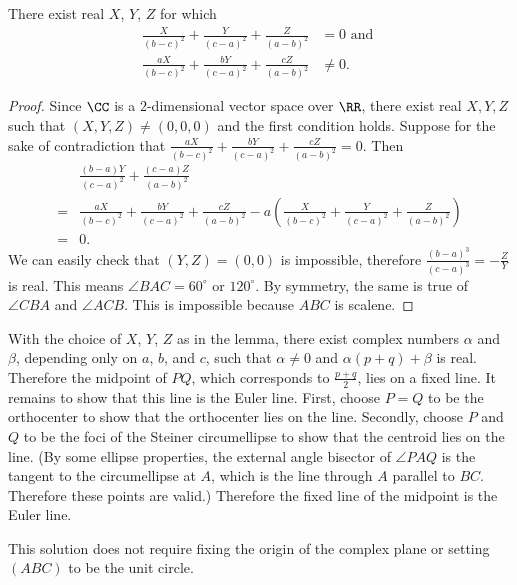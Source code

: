 \documentclass[11pt]{scrartcl}
\begin{document}
\begin{lemma*}
  There exist real $X$, $Y$, $Z$ for which
  \begin{align*}
    \frac{X}{(b-c)^2}+\frac{Y}{(c-a)^2}+\frac{Z}{(a-b)^2} &= 0 \text{ and } \\
    \frac{aX}{(b-c)^2}+\frac{bY}{(c-a)^2}+\frac{cZ}{(a-b)^2} &\neq 0.
  \end{align*}
\end{lemma*}

\begin{proof}
  Since $\CC$ is a $2$-dimensional vector space over $\RR$, there
  exist real $X, Y, Z$ such that $(X, Y, Z)\neq (0, 0, 0)$ and the first
  condition holds. Suppose for the sake of contradiction that
  $\frac{aX}{(b-c)^2}+\frac{bY}{(c-a)^2}+\frac{cZ}{(a-b)^2}=0$. Then
  \begin{align*}
    & \frac{(b-a)Y}{(c-a)^2}+\frac{(c-a)Z}{(a-b)^2}\\
    =& \frac{aX}{(b-c)^2}+\frac{bY}{(c-a)^2}+\frac{cZ}{(a-b)^2} -
    a\left(\frac{X}{(b-c)^2}+\frac{Y}{(c-a)^2}+\frac{Z}{(a-b)^2}\right) \\
    =& 0.
  \end{align*}
  We can easily check that $(Y, Z) = (0, 0)$ is impossible, therefore
  $\frac{(b-a)^3}{(c-a)^3} = -\frac{Z}{Y}$ is real.
  This means $\angle BAC = 60^{\circ}$ or $120^{\circ}$.
  By symmetry, the same is true of $\angle CBA$ and $\angle ACB$.
  This is impossible because $ABC$ is scalene.
\end{proof}

With the choice of $X$, $Y$, $Z$ as in the lemma, there exist complex numbers
$\alpha$ and $\beta$, depending only on $a$, $b$, and $c$, such that $\alpha\neq
0$ and $\alpha(p+q)+\beta$ is real. Therefore the midpoint of $PQ$, which
corresponds to $\frac{p+q}{2}$, lies on a fixed line. It remains to show that
this line is the Euler line. First, choose $P=Q$ to be the orthocenter to show
that the orthocenter lies on the line. Secondly, choose $P$ and $Q$ to be the
foci of the Steiner circumellipse to show that the centroid lies on the line.
(By some ellipse properties, the external angle bisector of $\angle PAQ$ is the
tangent to the circumellipse at $A$, which is the line through $A$ parallel to
$BC$. Therefore these points are valid.) Therefore the fixed line of the
midpoint is the Euler line.

\begin{remark*}
  This solution does not require fixing the origin of the complex plane or
  setting $(ABC)$ to be the unit circle.
\end{remark*}
\pagebreak
\end{document}
